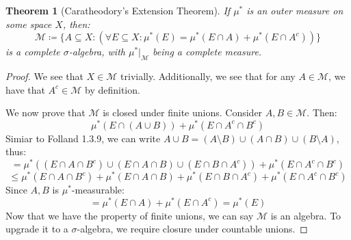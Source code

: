 \documentclass[10pt,letterpaper]{article} %
\newtheorem{thm}{Theorem}[section]
\begin{document}
\begin{thm}[Caratheodory's Extension Theorem]\label{Caratheodory's Thm}
If $\mu^*$ is an outer measure on some space $X$, then:
\begin{equation*}
\mathcal{M} \coloneq \{A \subseteq X : (\forall E \subseteq X: \mu^*(E) = \mu^*(E \cap A) + \mu^*(E \cap A^c))\}
\end{equation*}
is a complete $\sigma$-algebra, with $\mu^*|_{\mathcal{M}}$ being a complete measure.
\end{thm}
\begin{proof}
We see that $X \in \mathcal{M}$ trivially. Additionally, we see that for any $A \in \mathcal{M}$, we have that $A^c \in \mathcal{M}$ by definition.

We now prove that $\mathcal{M}$ is closed under finite unions. Consider $A, B \in \mathcal{M}$. Then:
\begin{equation*}
\mu^*(E \cap (A \cup B)) + \mu^*(E \cap A^c \cap B^c)
\end{equation*}
Simiar to Folland 1.3.9, we can write $A \cup B = (A \setminus B) \cup (A \cap B) \cup (B \setminus A)$, thus:
\begin{equation*}
= \mu^*((E \cap A \cap B^c) \cup (E \cap A \cap B) \cup (E \cap B \cap A^c)) + \mu^*(E \cap A^c \cap B^c)
\end{equation*}
\begin{equation*}
\leqslant \mu^*(E \cap A \cap B^c) + \mu^*(E \cap A \cap B) + \mu^*(E \cap B \cap A^c) + \mu^*(E \cap A^c \cap B^c)
\end{equation*}
Since $A, B$ is $\mu^*$-measurable:
\begin{equation*}
= \mu^*(E \cap A) + \mu^*(E \cap A^c) = \mu^*(E)
\end{equation*}
Now that we have the property of finite unions, we can say $\mathcal{M}$ is an algebra. To upgrade it to a $\sigma$-algebra, we require closure under countable unions. 


\end{proof}
\end{document}
